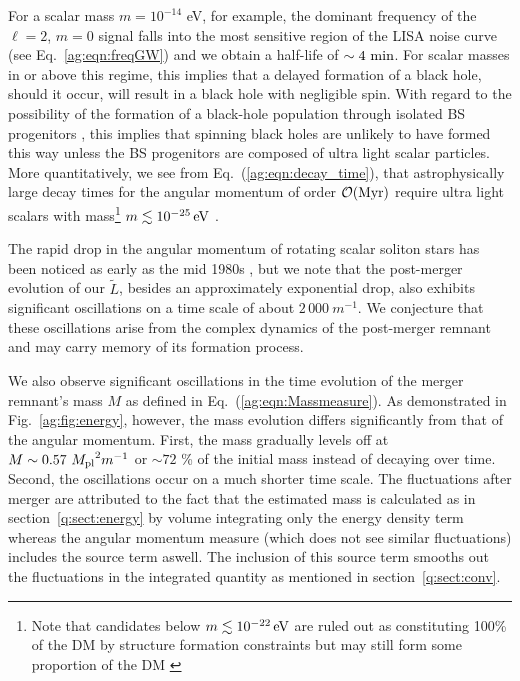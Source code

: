 %
For a scalar mass $m =  10^{-14}$ eV, for example,
the dominant frequency of the $\ell=2$, $m=0$ signal
falls into the most sensitive region of the LISA noise curve (see Eq.~\ref{ag:eqn:freqGW}) and we obtain a half-life of $\sim4~{\rm min}$. For scalar masses in or above this regime, this implies
that a delayed formation of a black hole, should it occur,
will result in a black hole with negligible spin. With regard to
the possibility of the formation of a black-hole population
through isolated BS progenitors
\cite{Helfer:2016ljl,Muia:2019coe}, this implies that
spinning black holes are unlikely to have formed this way unless
the BS progenitors are composed of ultra light scalar particles.
More quantitatively, we see from
Eq.~(\ref{ag:eqn:decay_time}), that
astrophysically large decay times for the angular momentum
of order
$\mathcal{O}({\rm Myr})$ require ultra light
scalars with mass\footnote{Note that candidates below $m\lesssim 10^{-22}\,{\rm eV}$ are ruled out as constituting 100\% of the DM by structure formation constraints but may still form some proportion of the DM \cite{Marsh:2015xka}}
$m\lesssim 10^{-25}\,{\rm eV}$ .



The rapid drop in the angular momentum of rotating
scalar soliton stars has been noticed as early as the mid 1980s
\cite{Lee:1986ts,Friedberg:1986tq},
but we note that the post-merger evolution of our $\tilde{L}$,
besides an approximately exponential drop, also exhibits
significant oscillations on a time scale of about
$2\,000~m^{-1}$. We conjecture that these oscillations
arise from the complex dynamics of the post-merger remnant
and may carry memory of its formation process.

We also observe significant oscillations in the time evolution
of the merger remnant's mass $M$ as defined in Eq.~(\ref{ag:eqn:Massmeasure}). As demonstrated in
Fig.~\ref{ag:fig:energy}, however, the mass evolution differs
significantly from that of the angular momentum.
First, the mass gradually levels off
at $M \sim 0.57~{M_{\rm pl}}^2 m^{-1}$ or $\sim 72$ \% of the initial mass instead of decaying over time.
Second, the oscillations occur on a much shorter time scale.
The fluctuations after merger
are attributed to the fact that the estimated mass is calculated
as in section~\ref{q:sect:energy} by volume integrating only the energy
density term whereas the angular momentum
measure (which does not see similar fluctuations) includes the source term
aswell. The inclusion of this source term smooths out the fluctuations in
the integrated quantity as mentioned in section~\ref{q:sect:conv}.

